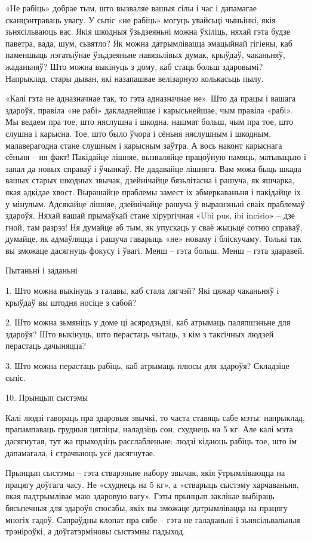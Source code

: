«Не рабіць» добрае тым, што вызваляе вашыя сілы і час і дапамагае сканцэнтраваць увагу. У сьпіс «не рабіць» могуць увайсьці чыньінкі, якія зьнясільваюць вас. Якія шкодныя ўзьдзеяньні можна ўхіліць, няхай гэта будзе паветра, вада, шум, сьвятло? Як можна датрымлівацца эмацыйнай гігіены, каб паменшыць нэгатыўнае ўзьдзеяньне навязьлівых думак, крыўдаў, чаканьняў, жаданьняў? Што можна выкінуць з дому, каб стаць больш здаровымі? Напрыклад, стары дыван, які назапашвае велізарную колькасьць пылу.

«Калі гэта не адназначнае так, то гэта адназначнае не». Што да працы і вашага здароўя, правіла «не рабі» дакладнейшае і карысьнейшае, чым правіла «рабі». Мы ведаем пра тое, што няслушна і шкодна, нашмат больш, чым пра тое, што слушна і карысна. Тое, што было ўчора і сёньня няслушным і шкодным, малаверагодна стане слушным і карысным заўтра. А вось наконт карыснага сёньня – ня факт! Пакідайце лішняе, вызваляйце працоўную памяць, матывацыю і запал да новых справаў і ўчынкаў. Не дадавайце лішняга. Вам можа быць шкада вашых старых шкодных звычак, дзейнічайце бязьлітасна і рашуча, як яшчарка, якая адкідае хвост. Вырашайце праблемы замест іх абмеркаваньня і пакідайце іх у мінулым. Адсякайце лішняе, дзейнічайце рашуча ў вырашэньні сваіх праблемаў здароўя. Няхай вашай прымаўкай стане хірургічная «Ubi pus, ibi incisio» – дзе гной, там разрэз! Ня думайце аб тым, як упускаць у сваё жыцьцё сотню справаў, думайце, як адмаўляцца і рашуча гаварыць «не» новаму і бліскучаму. Толькі так вы зможаце дасягнуць фокусу і ўвагі. Менш – гэта больш. Менш – гэта здаравей.

Пытаньні і заданьні

1. Што можна выкінуць з галавы, каб стала лягчэй? Які цяжар чаканьняў і крыўдаў вы штодня носіце з сабой?

2. Што можна зьмяніць у доме ці асяродзьдзі, каб атрымаць паляпшэньне для здароўя? Што выкінуць, што перастаць чытаць, з кім з таксічных людзей перастаць дачыняцца?

3. Што можна перастаць рабіць, каб атрымаць плюсы для здароўя? Складзіце сьпіс.


10. Прынцып сыстэмы

Калі людзі гавораць пра здаровыя звычкі, то часта ставяць сабе мэты: напрыклад, прапампаваць грудныя цягліцы, наладзіць сон, схуднець на 5 кг. Але калі мэта дасягнутая, тут жа прыходзіць расслабленьне: людзі кідаюць рабіць тое, што ім дапамагала, і страчваюць усё дасягнутае.

Прынцып сыстэмы – гэта стварэньне набору звычак, якія ўтрымліваюцца на працягу доўгага часу. Не «схуднець на 5 кг», а «стварыць сыстэму харчаваньня, якая падтрымлівае маю здаровую вагу». Гэты прынцып заклікае выбіраць бясьпечныя для здароўя спосабы, якіх вы зможаце датрымлівацца на працягу многіх гадоў. Сапраўдны клопат пра сябе – гэта не галаданьні і зьнясільвальныя трэніроўкі, а доўгатэрміновы сыстэмны падыход.

